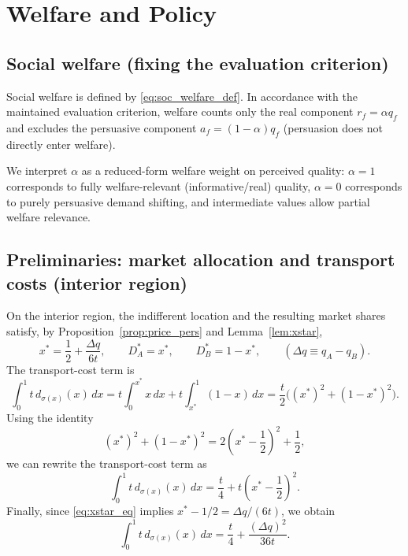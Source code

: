 
\section{Welfare and Policy}
\label{sec:welfare}

\subsection{Social welfare (fixing the evaluation criterion)}
Social welfare is defined by \eqref{eq:soc_welfare_def}. In accordance with the maintained evaluation criterion, welfare counts only the real component $r_f=\alpha q_f$ and excludes the persuasive component $a_f=(1-\alpha)q_f$ (persuasion does not directly enter welfare).

We interpret $\alpha$ as a reduced-form welfare weight on perceived quality: $\alpha=1$ corresponds to fully welfare-relevant (informative/real) quality, $\alpha=0$ corresponds to purely persuasive demand shifting, and intermediate values allow partial welfare relevance.

\subsection{Preliminaries: market allocation and transport costs (interior region)}
On the interior region, the indifferent location and the resulting market shares satisfy, by Proposition~\ref{prop:price_pers} and Lemma~\ref{lem:xstar},
\begin{equation}\label{eq:xstar_eq}
x^*=\frac{1}{2}+\frac{\Delta q}{6t},
\qquad
D_A^*=x^*,
\qquad
D_B^*=1-x^*,
\qquad (\Delta q\equiv q_A-q_B).
\end{equation}
The transport-cost term is
\begin{equation*}
\int_0^1 t\, d_{\sigma(x)}(x)\,dx
=t\int_0^{x^*} x\,dx+t\int_{x^*}^{1}(1-x)\,dx
=\frac{t}{2}\bigl((x^*)^2+(1-x^*)^2\bigr).
\end{equation*}
Using the identity
\[
(x^*)^2+(1-x^*)^2
=2\left(x^*-\frac{1}{2}\right)^2+\frac{1}{2},
\]
we can rewrite the transport-cost term as
\begin{equation*}
\int_0^1 t\, d_{\sigma(x)}(x)\,dx
=\frac{t}{4}+t\left(x^*-\frac{1}{2}\right)^2.
\end{equation*}
Finally, since \eqref{eq:xstar_eq} implies $x^*-1/2=\Delta q/(6t)$, we obtain
\begin{equation}\label{eq:transport_cost}
\int_0^1 t\, d_{\sigma(x)}(x)\,dx
=\frac{t}{4}+\frac{(\Delta q)^2}{36t}.
\end{equation}

